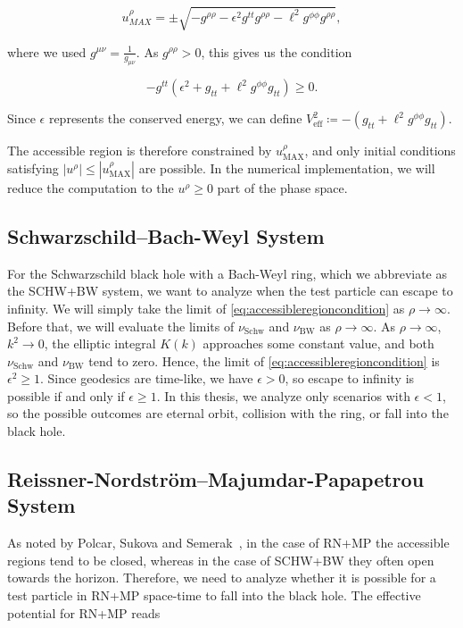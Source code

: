 \begin{equation}
    u^\rho_{MAX} = \pm \sqrt{
    -g^{\rho\rho}- \epsilon^2g^{tt}g^{\rho\rho}-\ell^2g^{\phi\phi}g^{\rho\rho}},
    \label{eq:urhomax2}
\end{equation}

where we used $g^{\mu\nu} = \frac{1}{g_{\mu\nu}}$. As $g^{\rho\rho} >0$, this gives us the condition

\begin{equation}
    -g^{tt}(\epsilon^2+g_{tt}+\ell^2g^{\phi\phi}g_{tt})\geq0.
    \label{eq:accessibleregioncondition}
\end{equation}

Since \(\epsilon\) represents the conserved energy, we can define
\(V_{\mathrm{eff}}^2 \coloneqq -(g_{tt}+\ell^2g^{\phi\phi}g_{tt})\).

The accessible region is therefore constrained by \(u^\rho_{\mathrm{MAX}}\), and only initial conditions satisfying \(|u^\rho|\leq|u^\rho_{\mathrm{MAX}}|\) are possible. In the numerical implementation, we will reduce the computation to the \(u^\rho \geq 0\) part of the phase space.

\subsection{Schwarzschild--Bach-Weyl System}
For the Schwarzschild black hole with a Bach-Weyl ring, which we abbreviate as the SCHW+BW system, we want to analyze when the test particle can escape to infinity. We will simply take the limit of \eqref{eq:accessibleregioncondition} as \(\rho \rightarrow\infty\). Before that, we will evaluate the limits of \(\nu_{\mathrm{Schw}}\) and \(\nu_{\mathrm{BW}}\) as \(\rho \rightarrow \infty\). As \(\rho \rightarrow \infty\), \(k^2 \rightarrow0\), the elliptic integral \(K(k)\) approaches some constant value, and both \(\nu_{\mathrm{Schw}}\) and \(\nu_{\mathrm{BW}}\) tend to zero. Hence, the limit of \eqref{eq:accessibleregioncondition} is \(\epsilon^2 \geq 1\). Since geodesics are time-like, we have \(\epsilon>0\), so escape to infinity is possible if and only if \(\epsilon \geq1\). In this thesis, we analyze only scenarios with \(\epsilon<1\), so the possible outcomes are eternal orbit, collision with the ring, or fall into the black hole. 

\subsection{Reissner-Nordstr\"om--Majumdar-Papapetrou System}
\label{subchap:RNMPanalysis}
As noted by Polcar, Sukova and Semerak~\cite{Polcar2019}, in the case of RN+MP the accessible regions tend to be closed, whereas in the case of
SCHW+BW they often open towards the horizon. Therefore, we need to analyze whether it is possible for a test particle in RN+MP space-time to fall into the black hole. The effective potential for RN+MP reads


